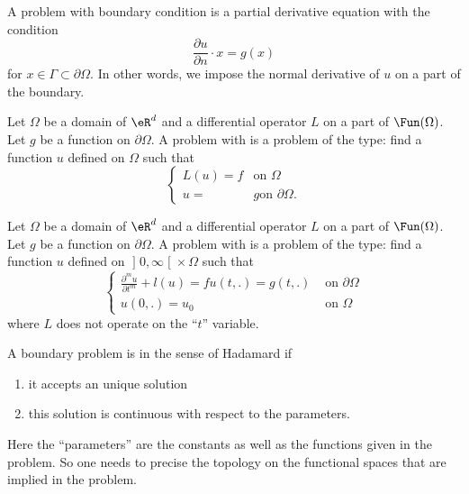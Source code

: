 \begin{definition}
	A problem with  boundary condition is a partial derivative equation with the condition
	\begin{equation}
		\frac{ \partial u }{ \partial n }\cdot x=g(x)
	\end{equation}
	for \( x\in\Gamma\subset\partial\Omega\). In other words, we impose the normal derivative of \( u\) on a part of the boundary.
\end{definition}

\begin{definition}
	Let \( \Omega\) be a domain of \( \eR^d\) and a differential operator \( L\) on a part of \( \Fun(\Omega)\). Let \( g\) be a function on \( \partial \Omega\). A problem with  is a problem of the type: find a function \( u\) defined on \( \Omega\) such that
	\begin{equation}
		\begin{cases}
			L(u)=f & \text{on } \Omega             \\
			u =    & g   \text{on }\partial\Omega.
		\end{cases}
	\end{equation}
\end{definition}

\begin{definition}
	Let \( \Omega\) be a domain of \( \eR^d\) and a differential operator \( L\) on a part of \( \Fun(\Omega)\). Let \( g\) be a function on \( \partial \Omega\). A problem with  is a problem of the type: find a function \( u\) defined on \( \mathopen] 0 , \infty \mathclose[\times \Omega\) such that
	\begin{equation}
		\begin{cases}
			\frac{ \partial^mu }{ \partial t^m }+l(u)=f
			u(t,.)=g(t,.) & \text{ on }\partial\Omega \\
			u(0,.)=u_0    & \text{ on }\Omega
		\end{cases}
	\end{equation}
	where \( L\) does not operate on the ``\( t\)'' variable.
\end{definition}

\begin{definition}
	A boundary problem is  in the sense of Hadamard if
	\begin{enumerate}
		\item
		      it accepts an unique solution
		\item
		      this solution is continuous with respect to the parameters.
	\end{enumerate}
	Here the ``parameters'' are the constants as well as the functions given in the problem. So one needs to precise the topology on the functional spaces that are implied in the problem.
\end{definition}

